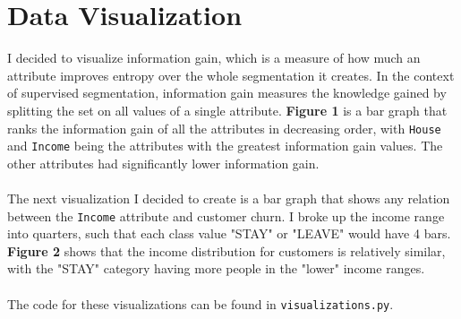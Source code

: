 \documentclass[12pt, notitlepage]{article}
\begin{document}
\section{Data Visualization}
I decided to visualize information gain, which is a measure of how much an attribute improves entropy over the whole segmentation it creates. In the context of supervised segmentation, information gain measures the knowledge gained by splitting the set on all values of a single attribute. \textbf{Figure 1} is a bar graph that ranks the information gain of all the attributes in decreasing order, with \texttt{House} and \texttt{Income} being the attributes with the greatest information gain values. The other attributes had significantly lower information gain.\\\\
The next visualization I decided to create is a bar graph that shows any relation between the \texttt{Income} attribute and customer churn. I broke up the income range into quarters, such that each class value "STAY" or "LEAVE" would have 4 bars. \textbf{Figure 2} shows that the income distribution for customers is relatively similar, with the "STAY" category having more people in the "lower" income ranges. \\\\
The code for these visualizations can be found in \texttt{visualizations.py}. 
\end{document}
